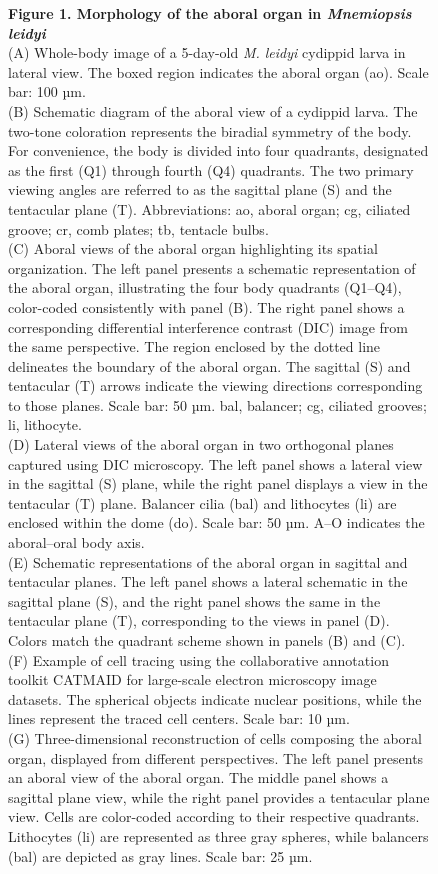 \documentclass[
  11pt,
]{article}
\begin{document}
\begin{figure}[H]
\caption{\textbf{Figure 1. Morphology of the aboral organ in
\emph{Mnemiopsis leidyi}}\\
(A) Whole-body image of a 5-day-old \emph{M. leidyi} cydippid larva in
lateral view. The boxed region indicates the aboral organ (ao). Scale
bar: 100 µm.\\
(B) Schematic diagram of the aboral view of a cydippid larva. The
two-tone coloration represents the biradial symmetry of the body. For
convenience, the body is divided into four quadrants, designated as the
first (Q1) through fourth (Q4) quadrants. The two primary viewing angles
are referred to as the sagittal plane (S) and the tentacular plane (T).
Abbreviations: ao, aboral organ; cg, ciliated groove; cr, comb plates;
tb, tentacle bulbs.\\
(C) Aboral views of the aboral organ highlighting its spatial
organization. The left panel presents a schematic representation of the
aboral organ, illustrating the four body quadrants (Q1--Q4), color-coded
consistently with panel (B). The right panel shows a corresponding
differential interference contrast (DIC) image from the same
perspective. The region enclosed by the dotted line delineates the
boundary of the aboral organ. The sagittal (S) and tentacular (T) arrows
indicate the viewing directions corresponding to those planes. Scale
bar: 50 µm. bal, balancer; cg, ciliated grooves; li, lithocyte.\\
(D) Lateral views of the aboral organ in two orthogonal planes captured
using DIC microscopy. The left panel shows a lateral view in the
sagittal (S) plane, while the right panel displays a view in the
tentacular (T) plane. Balancer cilia (bal) and lithocytes (li) are
enclosed within the dome (do). Scale bar: 50 µm. A--O indicates the
aboral--oral body axis.\\
(E) Schematic representations of the aboral organ in sagittal and
tentacular planes. The left panel shows a lateral schematic in the
sagittal plane (S), and the right panel shows the same in the tentacular
plane (T), corresponding to the views in panel (D). Colors match the
quadrant scheme shown in panels (B) and (C).\\
(F) Example of cell tracing using the collaborative annotation toolkit
CATMAID for large-scale electron microscopy image datasets. The
spherical objects indicate nuclear positions, while the lines represent
the traced cell centers. Scale bar: 10 µm.\\
(G) Three-dimensional reconstruction of cells composing the aboral
organ, displayed from different perspectives. The left panel presents an
aboral view of the aboral organ. The middle panel shows a sagittal plane
view, while the right panel provides a tentacular plane view. Cells are
color-coded according to their respective quadrants. Lithocytes (li) are
represented as three gray spheres, while balancers (bal) are depicted as
gray lines. Scale bar: 25 µm.}

\end{figure}%
\end{document}
